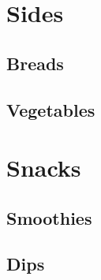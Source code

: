 \documentclass[twoside, openany]{book}
\newcommand{\dish}[1]{}
\begin{document}
\chapter{Sides}


\section{Breads}

\dish{Biscuits}

\dish{Dinner_rolls}

\dish{Squash_corn_muffins}

\dish{Cheddar_chive_cornbread}


\section{Vegetables}

\dish{Brussels_sprouts}

\dish{Corn_and_bean_salad}

\dish{Mashed_potatoes}

\dish{Roast_vegetables}

\dish{Roast_potatoes_metric}






\chapter{Snacks}

\section{Smoothies}

\dish{Berry_smoothie}

\dish{Green_tea_smoothie}

\section{Dips}

\dish{Black_bean_dip}

\dish{Salsa}

\dish{Nut_dip}

\dish{Pumpkin_butter}
\end{document}

